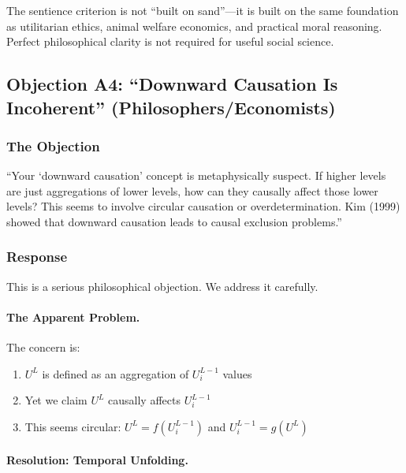 \documentclass[12pt,a4paper]{article}
\begin{document}
The sentience criterion is not ``built on sand''---it is built on the 
same foundation as utilitarian ethics, animal welfare economics, and 
practical moral reasoning. Perfect philosophical clarity is not required 
for useful social science.

\subsection{Objection A4: ``Downward Causation Is Incoherent'' (Philosophers/Economists)}
\label{app:downward-causation}

\subsubsection{The Objection}

\begin{tcolorbox}[colback=red!5!white, colframe=red!75!black, title=Philosopher's Objection]
``Your `downward causation' concept is metaphysically suspect. If higher 
levels are just aggregations of lower levels, how can they causally affect 
those lower levels? This seems to involve circular causation or overdetermination. 
Kim (1999) showed that downward causation leads to causal exclusion problems.''
\end{tcolorbox}

\subsubsection{Response}

This is a serious philosophical objection. We address it carefully.

\paragraph{The Apparent Problem.}

The concern is:
\begin{enumerate}[nosep]
\item $U^L$ is defined as an aggregation of $U^{L-1}_i$ values
\item Yet we claim $U^L$ causally affects $U^{L-1}_i$
\item This seems circular: $U^L = f(U^{L-1}_i)$ and $U^{L-1}_i = g(U^L)$
\end{enumerate}

\paragraph{Resolution: Temporal Unfolding.}
\end{document}
